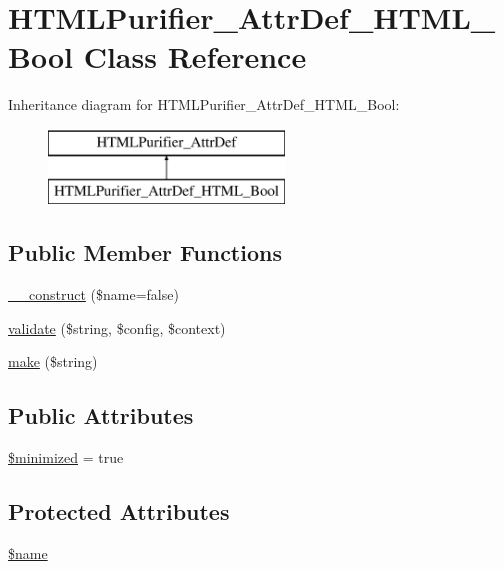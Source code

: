 \hypertarget{classHTMLPurifier__AttrDef__HTML__Bool}{\section{H\+T\+M\+L\+Purifier\+\_\+\+Attr\+Def\+\_\+\+H\+T\+M\+L\+\_\+\+Bool Class Reference}
\label{classHTMLPurifier__AttrDef__HTML__Bool}
}
Inheritance diagram for H\+T\+M\+L\+Purifier\+\_\+\+Attr\+Def\+\_\+\+H\+T\+M\+L\+\_\+\+Bool\+:\begin{figure}[H]
\begin{center}
\leavevmode
\includegraphics[height=2.000000cm]{classHTMLPurifier__AttrDef__HTML__Bool}
\end{center}
\end{figure}
\subsection*{Public Member Functions}
\begin{DoxyCompactItemize}
\item 
\hyperlink{classHTMLPurifier__AttrDef__HTML__Bool_a743abeec43a457064844827c5ad243d1}{\+\_\+\+\_\+construct} (\$name=false)
\item 
\hyperlink{classHTMLPurifier__AttrDef__HTML__Bool_aba41bf423cd3a8c9e2ffc31e138e9d68}{validate} (\$string, \$config, \$context)
\item 
\hyperlink{classHTMLPurifier__AttrDef__HTML__Bool_ab73069a01ae55b134a25431b7accae3f}{make} (\$string)
\end{DoxyCompactItemize}
\subsection*{Public Attributes}
\begin{DoxyCompactItemize}
\item 
\hyperlink{classHTMLPurifier__AttrDef__HTML__Bool_aaca2ecb54c295f3b65bfa1e81a7b8583}{\$minimized} = true
\end{DoxyCompactItemize}
\subsection*{Protected Attributes}
\begin{DoxyCompactItemize}
\item 
\hyperlink{classHTMLPurifier__AttrDef__HTML__Bool_afdbcd84359ce80275e8b8780b7d645ed}{\$name}
\end{DoxyCompactItemize}
